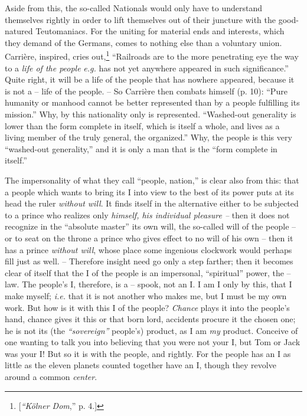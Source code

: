 Aside from this, the so-called Nationals would only have to understand 
themselves rightly in order to lift themselves out of their juncture with the 
good-natured Teutomaniacs. For the uniting for material ends and interests, 
which they demand of the Germans, comes to nothing else than a voluntary 
union. Carri\`ere, inspired, cries out,\footnote{[\textit{``K\"olner Dom},'' 
p. 4.]} ``Railroads are to the more penetrating eye the way to a \textit{life 
of the people} \textit{e.g.} has not yet anywhere appeared in such 
significance.'' Quite right, it will be a life of the people that has nowhere 
appeared, because it is not a -- life of the people. -- So Carri\`ere then 
combats himself (p. 10): ``Pure humanity or manhood cannot be better 
represented than by a people fulfilling its mission.'' Why, by this 
nationality only is represented. ``Washed-out generality is lower than the 
form complete in itself, which is itself a whole, and lives as a living member 
of the truly general, the organized.'' Why, the people is this very 
``washed-out generality,'' and it is only a man that is the ``form complete 
in itself.''

The impersonality of what they call ``people, nation,'' is clear also from 
this: that a people which wants to bring its I into view to the best of its 
power puts at its head the ruler \textit{without will}. It finds itself in the 
alternative either to be subjected to a prince who realizes only 
\textit{himself, his individual pleasure --} then it does not recognize in the 
``absolute master'' its own will, the so-called will of the people -- or to 
seat on the throne a prince who gives effect to no will of his own -- then it 
has a prince \textit{without will}, whose place some ingenious clockwork would 
perhaps fill just as well. -- Therefore insight need go only a step farther; 
then it becomes clear of itself that the I of the people is an impersonal, 
``spiritual'' power, the -- law. The people's I, therefore, is a -- spook, 
not an I. I am I only by this, that I make myself; \textit{i.e.} that it is 
not another who makes me, but I must be my own work. But how is it with this I 
of the people? \textit{Chance} plays it into the people's hand, chance gives 
it this or that born lord, accidents procure it the chosen one; he is not its 
(the \textit{``sovereign''} people's) product, as I am \textit{my} product. 
Conceive of one wanting to talk you into believing that you were not your I, 
but Tom or Jack was your I! But so it is with the people, and rightly. For the 
people has an I as little as the eleven planets counted together have an I, 
though they revolve around a common \textit{center}.

